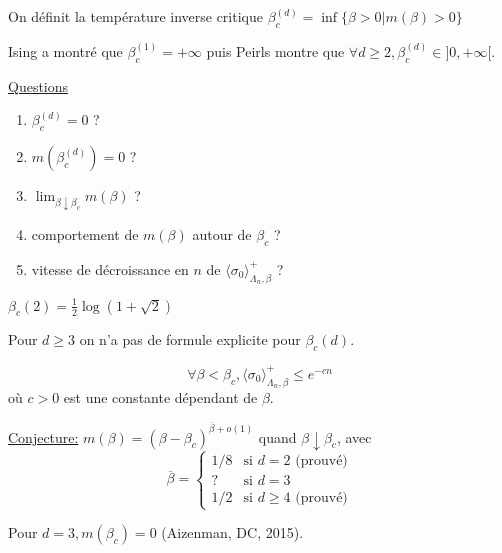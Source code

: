 \documentclass[a4paper,12pt]{report}
\begin{document}
\begin{defi}
On définit la température inverse critique $\beta_c^{(d)} = \inf \lbrace \beta > 0 \vert m(\beta) > 0 \rbrace$
\end{defi}

Ising a montré que $\beta_c^{(1)} = + \infty$ puis Peirls montre que $\forall d \geq 2, \beta_c^{(d)} \in ]0, + \infty [$.
\newline

\underline{Questions}
\begin{enumerate}
\item $\beta_c^{(d)} = 0$ ?
\item $m(\beta_c^{(d)})=0$ ?
\item $\lim_{\beta \downarrow \beta_c} m(\beta)$ ?
\item comportement de $m(\beta)$ autour de $\beta_c$ ?
\item vitesse de décroissance en $n$ de $\langle \sigma_0 \rangle^+_{\Lambda_n, \beta}$ ?
\end{enumerate}

\begin{thm}
$\beta_c(2) = \frac{1}{2} \log(1 + \sqrt{2})$
\end{thm}

Pour $d \geq 3$ on n'a pas de formule explicite pour $\beta_c(d)$.

\begin{thm}
$$\forall \beta < \beta_c, \langle \sigma_0 \rangle^+_{\Lambda_n, \beta} \leq e^{-cn}$$
où $c>0$ est une constante dépendant de $\beta$.
\end{thm}

\underline{Conjecture:} $m(\beta) = (\beta - \beta_c)^{\overline{\beta} + o(1)}$ quand $\beta \downarrow \beta_c$, avec
\begin{equation*}
\overline{\beta} =
\begin{cases}
1/8 & \text{si } d=2 \text{ (prouvé)}\\
? & \text{si } d=3 \\
1/2 & \text{si } d \geq 4 \text{ (prouvé)}
\end{cases}
\end{equation*}

Pour $d=3, m(\beta_c)=0$ (Aizenman, DC, 2015).
\newline
\end{document}
